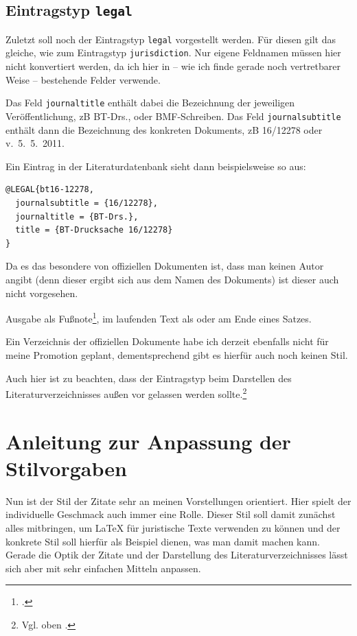 \subsection{Eintragstyp \texttt{legal}}


Zuletzt soll noch der Eintragstyp \texttt{legal} vorgestellt werden. Für diesen gilt das gleiche, wie 
zum Eintragstyp \texttt{jurisdiction}. Nur eigene Feldnamen müssen hier nicht konvertiert werden, da 
ich hier in -- wie ich finde gerade noch vertretbarer Weise -- bestehende Felder verwende.

Das Feld \texttt{journaltitle} enthält dabei die Bezeichnung der jeweiligen Veröffentlichung, zB 
BT-Drs., oder BMF-Schreiben. Das Feld \texttt{journalsubtitle} enthält dann die Bezeichnung des 
konkreten Dokuments, zB 16/12278 oder v.~5.~5.~2011.

Ein Eintrag in der Literaturdatenbank sieht dann beispielsweise so aus:

\begin{lstlisting}
@LEGAL{bt16-12278,
  journalsubtitle = {16/12278},
  journaltitle = {BT-Drs.},
  title = {BT-Drucksache 16/12278}
}
\end{lstlisting}

Da es das besondere von offiziellen Dokumenten ist, dass man keinen Autor angibt (denn dieser ergibt sich aus dem Namen des 
Dokuments) ist dieser auch nicht vorgesehen.

Ausgabe als Fußnote\footcite[3]{bt16-12278}, im laufenden Text als \cite[3]{bt16-12278} oder
am Ende eines Satzes.~\parencite[3]{bt16-12278}

Ein Verzeichnis der offiziellen Dokumente habe ich derzeit ebenfalls nicht für meine Promotion geplant, dementsprechend gibt 
es hierfür auch noch keinen Stil.

Auch hier ist zu beachten, dass der Eintragstyp beim Darstellen des Literaturverzeichnisses außen vor gelassen werden 
sollte.\footnote{Vgl. oben .}


\section{Anleitung zur Anpassung der Stilvorgaben}


Nun ist der Stil der Zitate sehr an meinen Vorstellungen orientiert. Hier spielt der individuelle Geschmack auch immer eine Rolle. Dieser Stil soll damit zunächst alles mitbringen, um \LaTeX{} für juristische Texte verwenden zu können und der konkrete Stil soll hierfür als Beispiel dienen, was man damit machen kann. Gerade die Optik der Zitate und der Darstellung des Literaturverzeichnisses lässt sich aber mit sehr einfachen Mitteln anpassen.

